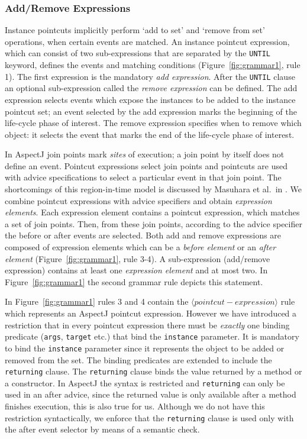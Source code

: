 \documentclass{acm_proc_article-sp}
\newcommand{\lstinln}[1]{\lstinline~#1~}
\begin{document}
\subsubsection{Add/Remove Expressions}
\label{sect:addrem}
Instance pointcuts implicitly perform `add to set' and `remove from set' operations, when certain events are matched. An instance pointcut expression, which can consist of two sub-expressions that are separated by the \lstinln{UNTIL} keyword,  defines the events and matching conditions (Figure~\ref{fig:grammar1}, rule 1). The first expression is the mandatory \emph{add expression}. After the \lstinln{UNTIL} clause an optional sub-expression called the \emph{remove expression} can be defined. The add expression selects events which expose the instances to be added to the instance pointcut set; an event selected by the add expression marks the beginning of the life-cycle phase of interest.  The remove expression specifies when to remove which object: it selects the event that marks the end of the life-cycle phase of interest. 

 
In AspectJ join points mark \emph{sites} of execution; a join point by itself does not define an event. 
Pointcut expressions select join points and pointcuts are used with advice specifications to select a particular event in that join point. The shortcomings of this region-in-time model is discussed by Masuhara et al.\ in \cite{masuharafine}.
We combine pointcut expressions with advice specifiers and obtain \emph{expression elements}. Each expression element contains a pointcut expression, which matches a set of join points. Then, from these join points, according to the advice specifier the before or after events are selected.
Both add and remove expressions are composed of expression elements which can be a \emph{before element} or an \emph{after element} (Figure~\ref{fig:grammar1}, rule 3-4). A sub-expression (add/remove expression) contains at least one \emph{expression element} and at most two. In Figure~\ref{fig:grammar1} the second grammar rule depicts this statement. 

In Figure~\ref{fig:grammar1} rules 3 and 4 contain the $\langle pointcut-expression\rangle$ rule which represents an AspectJ pointcut expression. However we have introduced a restriction that in every pointcut expression there must be \emph{exactly} one binding predicate (\lstinln{args}, \lstinln{target} etc.) that bind the \lstinln{instance} parameter. It is mandatory to bind the \lstinln{instance} parameter since it represents the object to be added or removed from the set. The binding predicates are extended to include the \lstinln{returning} clause. The \lstinln{returning} clause binds the value returned by a method or a constructor. In AspectJ the syntax is restricted and \lstinln{returning} can only be used in an after advice, since the returned value is only available after a method finishes execution, this is also true for us. Although we do not have this restriction syntactically, we enforce that the \lstinln{returning} clause is used only with the after event selector by means of a semantic check.  
\end{document}
